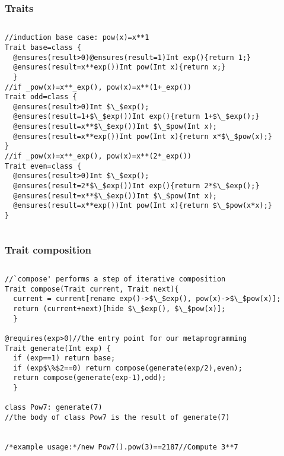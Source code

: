 \begin{frame}[fragile]
\frametitle{Traits}
\vspace{-3ex}
\begin{columns}
    \column{\dimexpr\paperwidth-10pt}
\begin{lstlisting}[basicstyle=\small]
//induction base case: pow(x)=x**1
Trait base=class {
  @ensures(result>0)@ensures(result=1)Int exp(){return 1;}  
  @ensures(result=x**exp())Int pow(Int x){return x;}
  }
//if _pow(x)=x**_exp(), pow(x)=x**(1+_exp())
Trait odd=class {
  @ensures(result>0)Int $\_$exp();
  @ensures(result=1+$\_$exp())Int exp(){return 1+$\_$exp();}
  @ensures(result=x**$\_$exp())Int $\_$pow(Int x);
  @ensures(result=x**exp())Int pow(Int x){return x*$\_$pow(x);}
}
//if _pow(x)=x**_exp(), pow(x)=x**(2*_exp())
Trait even=class {
  @ensures(result>0)Int $\_$exp();
  @ensures(result=2*$\_$exp())Int exp(){return 2*$\_$exp();}
  @ensures(result=x**$\_$exp())Int $\_$pow(Int x);
  @ensures(result=x**exp())Int pow(Int x){return $\_$pow(x*x);}
}
\end{lstlisting}
\end{columns}
\end{frame}

\begin{frame}[fragile]
\frametitle{Trait composition}
\vspace{-3ex}
\begin{columns}
    \column{\dimexpr\paperwidth-10pt}
\begin{lstlisting}[basicstyle=\small]
//`compose' performs a step of iterative composition
Trait compose(Trait current, Trait next){
  current = current[rename exp()->$\_$exp(), pow(x)->$\_$pow(x)];
  return (current+next)[hide $\_$exp(), $\_$pow(x)];
  }

@requires(exp>0)//the entry point for our metaprogramming
Trait generate(Int exp) {
  if (exp==1) return base;
  if (exp$\%$2==0) return compose(generate(exp/2),even);
  return compose(generate(exp-1),odd);
  }

class Pow7: generate(7)
//the body of class Pow7 is the result of generate(7)


/*example usage:*/new Pow7().pow(3)==2187//Compute 3**7
\end{lstlisting}
\end{columns}
\end{frame}

